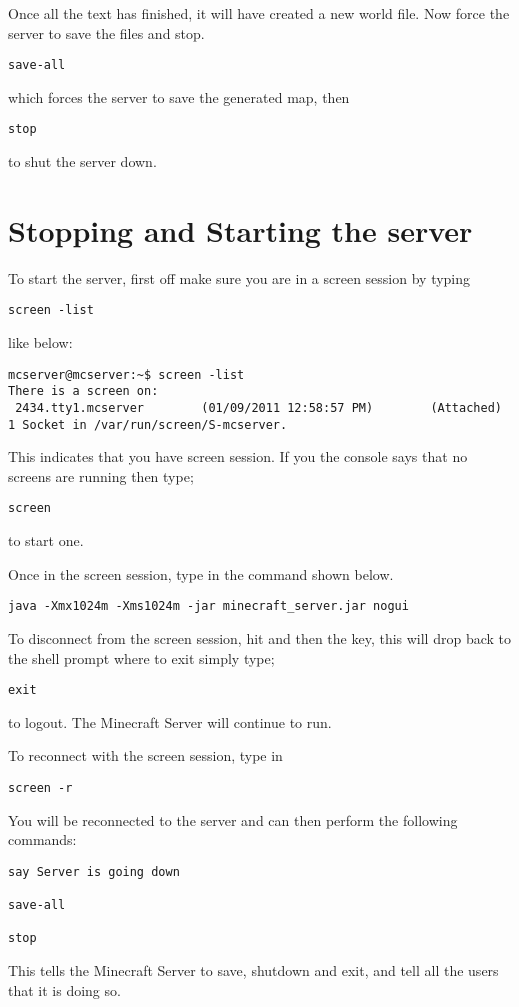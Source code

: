 Once all the text has finished, it will have created a new world file.  Now force the server to save the files and stop.

\begin{lstlisting}
save-all
\end{lstlisting}
which forces the server to save the generated map, then
\begin{lstlisting}
stop
\end{lstlisting}
to shut the server down.

\section{Stopping and Starting the server}

To start the server, first off make sure you are in a screen session by typing 
\begin{lstlisting}
screen -list
\end{lstlisting}
like below:
\begin{lstlisting}
mcserver@mcserver:~$ screen -list
There is a screen on:
 2434.tty1.mcserver        (01/09/2011 12:58:57 PM)        (Attached)
1 Socket in /var/run/screen/S-mcserver.
\end{lstlisting}

This indicates that you have screen session.  If you the console says that no screens are running then type;
\begin{lstlisting}
screen
\end{lstlisting}
to start one.

Once in the screen session, type in the command shown below.
\begin{lstlisting}
java -Xmx1024m -Xms1024m -jar minecraft_server.jar nogui
\end{lstlisting}
To disconnect from the screen session, hit  and then the  key, this will drop back to the shell prompt where to exit simply type;
\begin{lstlisting}
exit
\end{lstlisting}
to logout. The Minecraft Server will continue to run.

To reconnect with the screen session, type in
\begin{lstlisting}
screen -r
\end{lstlisting}
You will be reconnected to the server and can then perform the following commands:
\begin{lstlisting}
say Server is going down

save-all

stop
\end{lstlisting}
This tells the Minecraft Server to save, shutdown and exit, and tell all the users that it is doing so.

